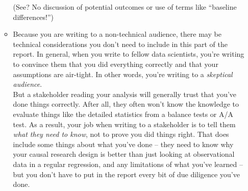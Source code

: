 \documentclass[12pt]{article}
\begin{document}
\begin{enumerate}
\begin{itemize}
        (See? No discussion of potential outcomes or use of terms like ``baseline differences!'')
        \item Because you are writing to a non-technical audience, there may be technical considerations you don't need to include in this part of the report. In general, when you write to fellow data scientists, you're writing to convince them that you did everything correctly and that your assumptions are air-tight. In other words, you're writing to a \emph{skeptical audience}. \\
        But a stakeholder reading your analysis will generally trust that you've done things correctly. After all, they often won't know the knowledge to evaluate things like the detailed statistics from a balance tests or A/A test. As a result, your job when writing to a stakeholder is to tell them \emph{what they need to know}, not to prove you did things right. That does include some things about what you've done -- they need to know why your causal research design is better than just looking at observational data in a regular regression, and any limitations of what you've learned -- but you don't have to put in the report every bit of due diligence you've done. 
    \end{itemize} 
\end{enumerate}
\end{document}
